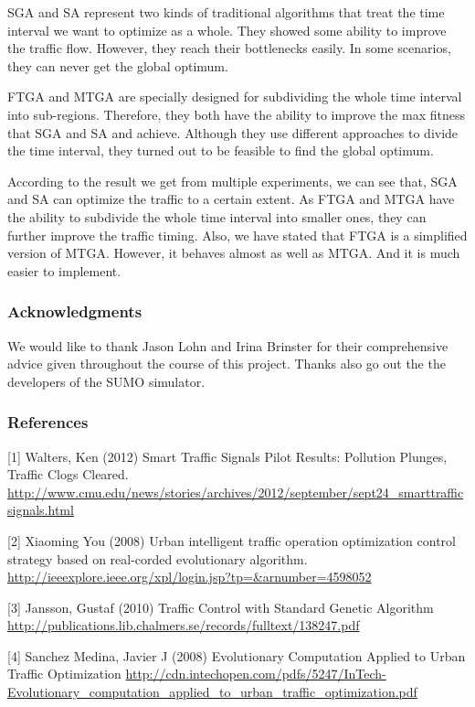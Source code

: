 \documentclass{article} %
\begin{document}
SGA and SA represent two kinds of traditional algorithms that treat the time interval we want to optimize as a whole. They showed some ability to improve the traffic flow. However, they reach their bottlenecks easily. In some scenarios, they can never get the global optimum. 

FTGA and MTGA are specially designed for subdividing the whole time interval into sub-regions. Therefore, they both have the ability to improve the max fitness that SGA and SA and achieve. Although they use different approaches to divide the time interval, they turned out to be feasible to find the global optimum. 

According to the result we get from multiple experiments, we can see that, SGA and SA can optimize the traffic to a certain extent. As FTGA and MTGA have the ability to subdivide the whole time interval into smaller ones, they can further improve the traffic timing. Also, we have stated that FTGA is a simplified version of MTGA. However, it behaves almost as well as MTGA. And it is much easier to implement.


\subsubsection*{Acknowledgments}

We would like to thank Jason Lohn and Irina Brinster for their comprehensive advice given throughout the course of this project. Thanks also go out the the developers of the SUMO simulator.

\subsubsection*{References}

\small{
[1] Walters, Ken (2012) Smart Traffic Signals Pilot Results: Pollution Plunges, Traffic Clogs Cleared. \url{http://www.cmu.edu/news/stories/archives/2012/september/sept24_smarttrafficsignals.html}

[2] Xiaoming You (2008) Urban intelligent traffic operation optimization control strategy based on real-corded evolutionary algorithm. \url{http://ieeexplore.ieee.org/xpl/login.jsp?tp=&arnumber=4598052}

[3] Jansson, Gustaf (2010) Traffic Control with Standard Genetic Algorithm \url{http://publications.lib.chalmers.se/records/fulltext/138247.pdf}

[4] Sanchez Medina, Javier J (2008) Evolutionary Computation Applied to Urban Traffic Optimization \url{http://cdn.intechopen.com/pdfs/5247/InTech-Evolutionary_computation_applied_to_urban_traffic_optimization.pdf}
}
\end{document}
